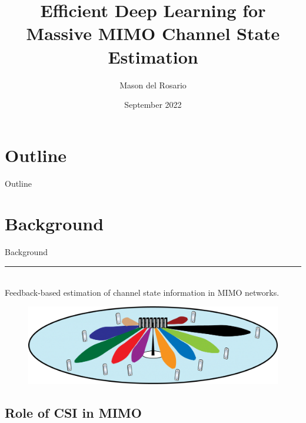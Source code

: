 \documentclass{beamer}
\title{Efficient Deep Learning for Massive MIMO Channel State Estimation}
\author{\small{Mason del Rosario}}
\institute{Doctoral Exit Seminar}
\date{September 2022} %
\begin{document}
% 


{ 
\frame{\titlepage}}

\section*{Outline}\begin{frame}{Outline}\tableofcontents\end{frame}

\section{Background}

  \begin{frame}[plain]
    \vfill
    \centering
    \begin{beamercolorbox}[sep=8pt,center,shadow=true,rounded=true]{Background}
      \insertsectionhead\par%
      \color{davisblue}\noindent\rule{10cm}{1pt} \\
      \footnotesize{Feedback-based estimation of channel state information in MIMO networks.}
    \end{beamercolorbox}
    \vfill
    \begin{figure}[htb]
      \centering
      \includegraphics[width=.8\textwidth]{mimo-downlink.png} %
      \medskip
    \end{figure}
  \end{frame}

\subsection{Role of CSI in MIMO}

\end{document}
